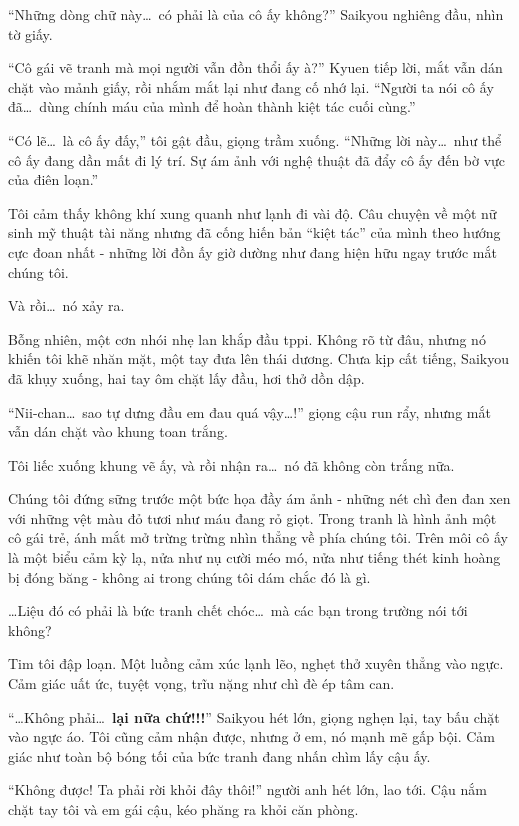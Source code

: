\documentclass[../main.tex]{subfiles}
\begin{document}
``Những dòng chữ này\dots\ có phải là của cô ấy không?'' Saikyou nghiêng đầu, nhìn tờ giấy.

``Cô gái vẽ tranh mà mọi người vẫn đồn thổi ấy à?'' Kyuen tiếp lời, mắt vẫn dán chặt vào mảnh giấy, rồi nhắm mắt lại như đang cố nhớ lại. ``Người ta nói cô ấy đã\dots\ dùng chính máu của mình để hoàn thành kiệt tác cuối cùng.''

``Có lẽ\dots\ là cô ấy đấy,'' tôi gật đầu, giọng trầm xuống. ``Những lời này\dots\ như thể cô ấy đang dần mất đi lý trí. Sự ám ảnh với nghệ thuật đã đẩy cô ấy đến bờ vực của điên loạn.''

Tôi cảm thấy không khí xung quanh như lạnh đi vài độ. Câu chuyện về một nữ sinh mỹ thuật tài năng nhưng đã cống hiến bản ``kiệt tác'' của mình theo hướng cực đoan nhất - những lời đồn ấy giờ dường như đang hiện hữu ngay trước mắt chúng tôi.

Và rồi\dots\ nó xảy ra.

Bỗng nhiên, một cơn nhói nhẹ lan khắp đầu tppi. Không rõ từ đâu, nhưng nó khiến tôi khẽ nhăn mặt, một tay đưa lên thái dương. Chưa kịp cất tiếng, Saikyou đã khụy xuống, hai tay ôm chặt lấy đầu, hơi thở dồn dập.

``Nii-chan\dots\ sao tự dưng đầu em đau quá vậy\dots!'' giọng cậu run rẩy, nhưng mắt vẫn dán chặt vào khung toan trắng.

Tôi liếc xuống khung vẽ ấy, và rồi nhận ra\dots\ nó đã không còn trắng nữa.

Chúng tôi đứng sững trước một bức họa đầy ám ảnh - những nét chì đen đan xen với những vệt màu đỏ tươi như máu đang rỏ giọt. Trong tranh là hình ảnh một cô gái trẻ, ánh mắt mở trừng trừng nhìn thẳng về phía chúng tôi. Trên môi cô ấy là một biểu cảm kỳ lạ, nửa như nụ cười méo mó, nửa như tiếng thét kinh hoàng bị đóng băng - không ai trong chúng tôi dám chắc đó là gì.

\dots Liệu đó có phải là bức tranh chết chóc\dots\ mà các bạn trong trường nói tới không?

Tim tôi đập loạn. Một luồng cảm xúc lạnh lẽo, nghẹt thở xuyên thẳng vào ngực. Cảm giác uất ức, tuyệt vọng, trĩu nặng như chì đè ép tâm can.

``\dots Không phải\dots\ \textbf{lại nữa chứ!!!}'' Saikyou hét lớn, giọng nghẹn lại, tay bấu chặt vào ngực áo. Tôi cũng cảm nhận được, nhưng ở em, nó mạnh mẽ gấp bội. Cảm giác như toàn bộ bóng tối của bức tranh đang nhấn chìm lấy cậu ấy.

``Không được! Ta phải rời khỏi đây thôi!'' người anh hét lớn, lao tới. Cậu nắm chặt tay tôi và em gái cậu, kéo phăng ra khỏi căn phòng.
\end{document}
